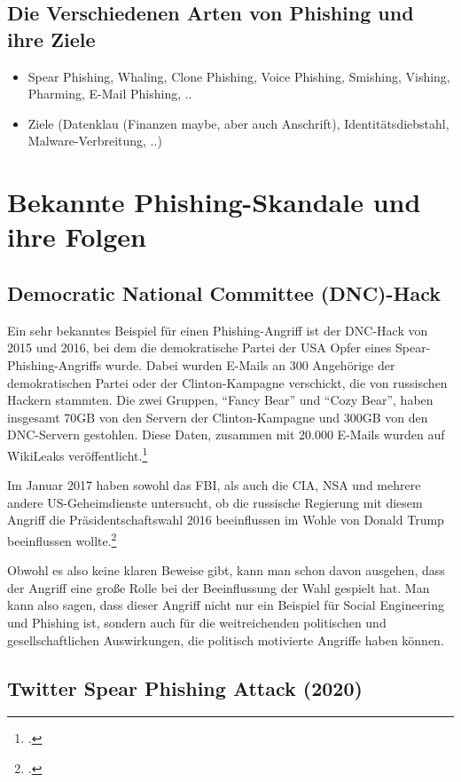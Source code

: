 \documentclass[12pt, a4paper, oneside]{scrartcl}
\begin{document}
\subsection{Die Verschiedenen Arten von Phishing und ihre Ziele}
\begin{itemize}
  \item Spear Phishing, Whaling, Clone Phishing, Voice Phishing, Smishing, Vishing, Pharming, E-Mail Phishing, ..
  \item Ziele (Datenklau (Finanzen maybe, aber auch Anschrift), Identitätsdiebstahl, Malware-Verbreitung, ..)
\end{itemize}

\section{Bekannte Phishing-Skandale und ihre Folgen}

\subsection{Democratic National Committee (DNC)-Hack}
Ein sehr bekanntes Beispiel für einen Phishing-Angriff ist der DNC-Hack von 2015 und 2016, 
bei dem die demokratische Partei der USA Opfer eines Spear-Phishing-Angriffs wurde. 
Dabei wurden E-Mails an 300 Angehörige der demokratischen Partei oder der Clinton-Kampagne
verschickt, die von russischen Hackern stammten. Die zwei Gruppen, ``Fancy Bear'' und ``Cozy Bear'',
haben insgesamt 70GB von den Servern der Clinton-Kampagne und 300GB von den DNC-Servern gestohlen.
Diese Daten, zusammen mit 20.000 E-Mails wurden auf WikiLeaks veröffentlicht.\footcite{IDStrong_DNC}
\par
Im Januar 2017 haben sowohl das FBI, als auch die CIA, NSA und mehrere andere US-Geheimdienste
untersucht, ob die russische Regierung mit diesem Angriff die Präsidentschaftswahl 2016 beeinflussen 
im Wohle von Donald Trump beeinflussen wollte.\footcite{NYT_DNC}
\par
Obwohl es also keine klaren Beweise gibt, kann man schon davon ausgehen, dass der Angriff eine 
große Rolle bei der Beeinflussung der Wahl gespielt hat. Man kann also sagen, dass dieser Angriff 
nicht nur ein Beispiel für Social Engineering und Phishing ist, sondern auch für die weitreichenden 
politischen und gesellschaftlichen Auswirkungen, die politisch motivierte Angriffe haben können.

\subsection{Twitter Spear Phishing Attack (2020)}
\end{document}
